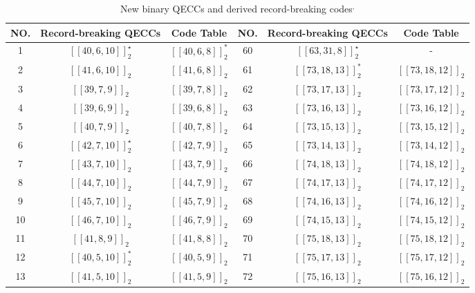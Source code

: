 \documentclass[journal]{IEEEtran}
\begin{document}
\begin{table}[!t]
	\centering
	\begin{threeparttable}
		\caption{ New binary QECCs  and derived record-breaking codes$^{,}$}\label{all_QECCs}
		\footnotesize
		\begin{tabular}{cccccc}
			\hline
			NO. & Record-breaking  QECCs  & Code Table \cite{Grassltable} & NO. &  Record-breaking QECCs  & Code Table \cite{Grassltable} \\ \hline
			 1  & $[[40,6,10]]_2^{\star}$ &       $[[40,6,8]]_2^*$        & 60  & $[[63,31,8]]_2^{\star}$ &               -               \\
			 2  &     $[[41,6,10]]_2$     &        $[[41,6,8]]_2$         & 61  &   $[[73,18,13]]_2^*$    &       $[[73,18,12]]_2$        \\
			 3  &     $[[39,7,9]]_2$      &        $[[39,7,8]]_2$         & 62  &    $[[73,17,13]]_2$     &       $[[73,17,12]]_2$        \\
			 4  &     $[[39,6,9]]_2$      &        $[[39,6,8]]_2$         & 63  &    $[[73,16,13]]_2$     &       $[[73,16,12]]_2$        \\
			 5  &     $[[40,7,9]]_2$      &        $[[40,7,8]]_2$         & 64  &    $[[73,15,13]]_2$     &       $[[73,15,12]]_2$        \\
			 6  & $[[42,7,10]]_2^{\star}$ &        $[[42,7,9]]_2$         & 65  &    $[[73,14,13]]_2$     &       $[[73,14,12]]_2$        \\
			 7  &     $[[43,7,10]]_2$     &        $[[43,7,9]]_2$         & 66  &    $[[74,18,13]]_2$     &       $[[74,18,12]]_2$        \\
			 8  &     $[[44,7,10]]_2$     &        $[[44,7,9]]_2$         & 67  &    $[[74,17,13]]_2$     &       $[[74,17,12]]_2$        \\
			 9  &     $[[45,7,10]]_2$     &        $[[45,7,9]]_2$         & 68  &    $[[74,16,13]]_2$     &       $[[74,16,12]]_2$        \\
			10  &     $[[46,7,10]]_2$     &        $[[46,7,9]]_2$         & 69  &    $[[74,15,13]]_2$     &       $[[74,15,12]]_2$        \\
			11  &     $[[41,8,9]]_2$      &        $[[41,8,8]]_2$         & 70  &    $[[75,18,13]]_2$     &       $[[75,18,12]]_2$        \\
			12  &    $[[40,5,10]]_2^*$    &        $[[40,5,9]]_2$         & 71  &    $[[75,17,13]]_2$     &       $[[75,17,12]]_2$        \\
			13  &     $[[41,5,10]]_2$     &        $[[41,5,9]]_2$         & 72  &    $[[75,16,13]]_2$     &       $[[75,16,12]]_2$        \\

\end{tabular}
\end{threeparttable}
\end{table}
\end{document}

